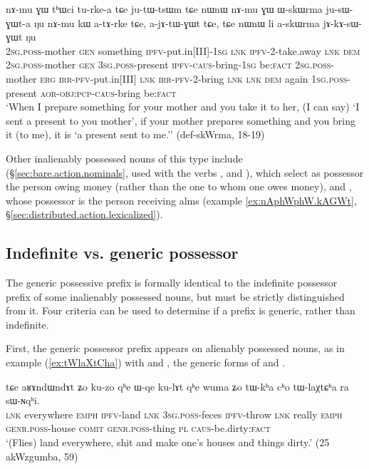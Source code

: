 \begin{exe}
\ex \label{ex:askWrma}
\gll nɤ-mu ɣɯ tʰɯci tu-rke-a tɕe ju-tɯ-tsɯm tɕe nɯnɯ nɤ-mu ɣɯ ɯ-skɯrma ju-sɯ-ɣɯt-a ŋu nɤ-mu kɯ a-tɤ-rke tɕe, a-jɤ-tɯ-ɣɯt tɕe, tɕe nɯnɯ li a-skɯrma jɤ-kɤ-sɯ-ɣɯt ŋu \\
\textsc{2sg}.\textsc{poss}-mother \textsc{gen} something \textsc{ipfv}-put.in[III]-\textsc{1sg} \textsc{lnk} \textsc{ipfv}-2-take.away \textsc{lnk} \textsc{dem} \textsc{2sg}.\textsc{poss}-mother \textsc{gen} \textsc{3sg}.\textsc{poss}-present  \textsc{ipfv}-\textsc{caus}-bring-\textsc{1sg} be:\textsc{fact} \textsc{2sg}.\textsc{poss}-mother  \textsc{erg} \textsc{irr}-\textsc{pfv}-put.in[III] \textsc{lnk} \textsc{irr}-\textsc{pfv}-2-bring \textsc{lnk} \textsc{lnk} \textsc{dem} again \textsc{1sg}.\textsc{poss}-present \textsc{aor}-\textsc{obj}:\textsc{pcp}-\textsc{caus}-bring be:\textsc{fact} \\
\glt `When I prepare something for your mother and you take it to her, (I can say) `I sent a present to you mother', if your mother prepares something and you bring it (to me), it is `a present sent to me.'' (def-skWrma, 18-19)
\end{exe}

Other inalienably possessed nouns of this type include  (§\ref{sec:bare.action.nominals}, used with the verbs ,  and ), which select as possessor the person owing money (rather than the one to whom one owes money), and , whose possessor is the person receiving alms (example \ref{ex:nAphWphW.kAGWt}, §\ref{sec:distributed.action.lexicalized}).

\subsection{Indefinite vs. generic possessor} \label{sec:indef.genr.poss}
The generic possessive prefix  is formally identical to the indefinite possessor prefix of some inalienably possessed nouns, but must be strictly distinguished from it. Four criteria can be used to determine if a  prefix is generic, rather than indefinite.

First, the generic possessor prefix appears on alienably possessed nouns, as in example (\ref{ex:tWlaXtCha}) with  and , the generic forms of  and .

\begin{exe}
\ex \label{ex:tWlaXtCha}
\gll tɕe aʁɤndɯndɤt  ʑo  ku-zo  qʰe  ɯ-qe  ku-lɤt  qʰe wuma ʑo  tɯ-kʰa  cʰo  tɯ-laχtɕʰa  ra  sɯ-ɴqʰi.  \\
\textsc{lnk} everywhere \textsc{emph} \textsc{ipfv}-land \textsc{lnk} \textsc{3sg}.\textsc{poss}-feces \textsc{ipfv}-throw \textsc{lnk} really \textsc{emph} \textsc{genr}.\textsc{poss}-house \textsc{comit} \textsc{genr}.\textsc{poss}-thing \textsc{pl} \textsc{caus}-be.dirty:\textsc{fact} \\
\glt `(Flies) land everywhere, shit and make one's houses and things dirty.' (25 akWzgumba, 59)
\end{exe}


